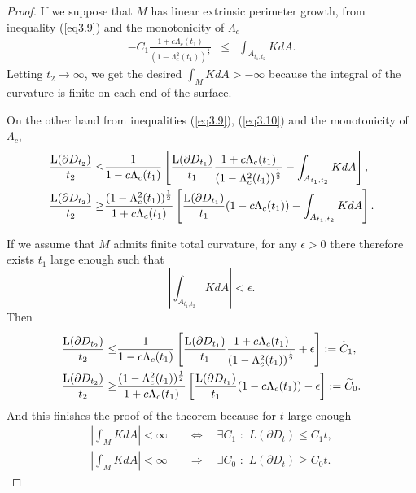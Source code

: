 \documentclass[a4paper]{amsart}
\theoremstyle{definition}
\numberwithin{equation}{section}
\begin{document}
\begin{proof}
If we suppose that $M$ has  linear extrinsic perimeter growth, from inequality (\ref{eq3.9}) and the monotonicity of $\Lambda_c$
\begin{equation}\begin{array}{lll}-\displaystyle C_1\frac{1+c\Lambda_c(t_1)}{\left(1-\Lambda^2_c(t_1)\right)^{\frac{1}{2}}}&\leq & \int_{A_{t_1,t_2}}K dA.
\end{array}
\end{equation}Letting $t_2\to\infty$, we get the desired $\int_MKdA>-\infty$ because the integral of the curvature is finite on each end of the surface.

On the other hand from inequalities (\ref{eq3.9}), (\ref{eq3.10}) and the monotonicity of $\Lambda_c$,
\begin{equation}
\begin{aligned}
\frac{{\rm L}(\partial D_{t_2})}{t_2}\leq &\frac{1}{1-c\Lambda_c(t_1)}\left[\frac{{\rm L}(\partial D_{t_1})}{t_1}\displaystyle\frac{1+c\Lambda_c(t_1)}{\left(1-\Lambda^2_c(t_1)\right)^{\frac{1}{2}}}-\int_{A_{t_1,t_2}}K dA\right],\\
\frac{{\rm L}(\partial D_{t_2})}{t_2}\geq &\frac{(1-\Lambda_c^2(t_1))^\frac{1}{2}}{1+c\Lambda_c(t_1)}\left[\frac{{\rm L}(\partial D_{t_1})}{t_1}(1-c\Lambda_c(t_1))-\int_{A_{t_1,t_2}}K dA\right].
\end{aligned}
\end{equation}

If we assume that $M$ admits finite total curvature, for any $\epsilon>0$ there therefore exists $t_1$ large enough such that
\begin{equation}
 \left\vert\int_{A_{t_1,t_2}}K dA\right\vert<\epsilon.
\end{equation}
Then
\begin{equation}
\begin{aligned}
\frac{{\rm L}(\partial D_{t_2})}{t_2}\leq &\frac{1}{1-c\Lambda_c(t_1)}\left[\frac{{\rm L}(\partial D_{t_1})}{t_1}\displaystyle\frac{1+c\Lambda_c(t_1)}{\left(1-\Lambda^2_c(t_1)\right)^{\frac{1}{2}}}+\epsilon\right]:=\widetilde C_1,\\
\frac{{\rm L}(\partial D_{t_2})}{t_2}\geq &\frac{(1-\Lambda_c^2(t_1))^\frac{1}{2}}{1+c\Lambda_c(t_1)}\left[\frac{{\rm L}(\partial D_{t_1})}{t_1}(1-c\Lambda_c(t_1))-\epsilon\right]:=\widetilde C_0.
\end{aligned}
\end{equation}
And this finishes the proof of the theorem because for $t$ large enough
\begin{equation}
\begin{aligned}
\left\vert\int_MKdA\right\vert<\infty \quad &\Longleftrightarrow \quad \exists C_1\,\,:\,\, L(\partial D_t)\leq C_1 t,\\
\left\vert\int_MKdA\right\vert<\infty \quad &\Longrightarrow \quad \exists C_0\,\,:\,\, L(\partial D_t)\geq C_0 t.
\end{aligned}
\end{equation}\end{proof}
\end{document}
